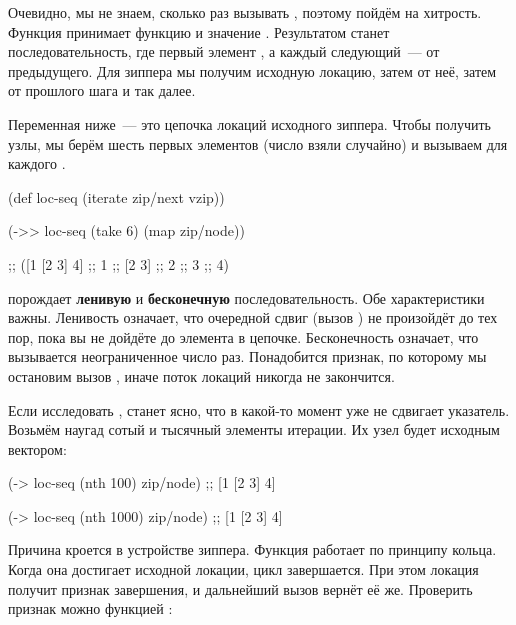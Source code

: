 Очевидно, мы не знаем, сколько раз вызывать , поэтому пойдём на
хитрость. Функция  принимает функцию  и значение . Результатом
станет последовательность, где первый элемент , а каждый следующий~--- 
от предыдущего. Для зиппера мы получим исходную локацию, затем  от
неё, затем  от прошлого шага и так далее.

Переменная  ниже~--- это цепочка локаций исходного зиппера. Чтобы
получить узлы, мы берём шесть первых элементов (число взяли случайно) и вызываем
для каждого .

\begin{english}
  \begin{clojure}
(def loc-seq
  (iterate zip/next vzip))

(->> loc-seq
     (take 6)
     (map zip/node))

;; ([1 [2 3] 4]
;;  1
;;  [2 3]
;;  2
;;  3
;;  4)
  \end{clojure}
\end{english}

 порождает \textbf{ленивую} и \textbf{бесконечную} последовательность. Обе
характеристики важны. Ленивость означает, что очередной сдвиг (вызов )
не произойдёт до тех пор, пока вы не дойдёте до элемента в
цепочке. Бесконечность означает, что  вызывается неограниченное число
раз. Понадобится признак, по которому мы остановим вызов , иначе поток
локаций никогда не закончится.

Если исследовать , станет ясно, что в какой-то момент  уже не
сдвигает указатель. Возьмём наугад сотый и тысячный элементы итерации. Их узел
будет исходным вектором:

\begin{english}
  \begin{clojure}
(-> loc-seq (nth 100) zip/node)
;; [1 [2 3] 4]

(-> loc-seq (nth 1000) zip/node)
;; [1 [2 3] 4]

  \end{clojure}
\end{english}

Причина кроется в устройстве зиппера. Функция  работает по принципу
кольца. Когда она достигает исходной локации, цикл завершается. При этом локация
получит признак завершения, и дальнейший вызов  вернёт её
же. Проверить признак можно функцией :

